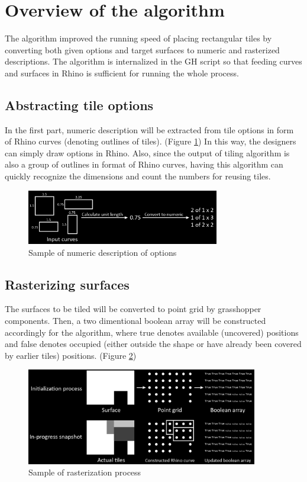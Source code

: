 \documentclass{article}
\begin{document}
\FloatBarrier

\section{Overview of the algorithm}

The algorithm improved the running speed of placing rectangular tiles by converting both given options and target surfaces to numeric and rasterized descriptions. The algorithm is internalized in the GH script so that feeding curves and surfaces in Rhino is sufficient for running the whole process.

\subsection{Abstracting tile options}

In the first part, numeric description will be extracted from tile options in form of Rhino curves (denoting outlines of tiles). (Figure \ref{num}) In this way, the designers can simply draw options in Rhino. Also, since the output of tiling algorithm is also a group of outlines in format of Rhino curves, having this algorithm can quickly recognize the dimensions and count the numbers for reusing tiles.

\begin{figure}[hbt!]
	\centering
	\includegraphics[width=0.75\textwidth]{Figures/Numeric.png}
	\caption{Sample of numeric description of options}
	\label{num}
\end{figure}

\subsection{Rasterizing surfaces}

The surfaces to be tiled will be converted to point grid by grasshopper components. Then, a two dimentional boolean array will be constructed accordingly for the algorithm, where true denotes available (uncovered) positions and false denotes occupied (either outside the shape or have already been covered by earlier tiles) positions. (Figure \ref{rast})

\begin{figure}[hbt!]
	\centering
	\includegraphics[width=0.9\textwidth]{Figures/Rasterization.png}
	\caption{Sample of rasterization process}
	\label{rast}
\end{figure}
\end{document}
